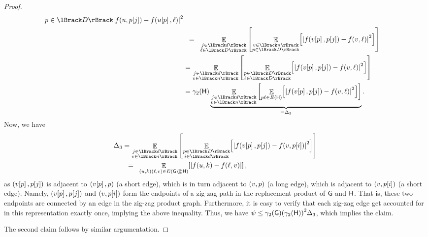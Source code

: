 \begin{proof}
\begin{align*}
{{              p \in \RangeI{D}}
           {\cardin{f\pth{u,\NX{p}{j}} - f\pth{ \NX{u}{p},\ell}}^2}}
        \\&
        \EQ
        {\ExExtS{j \in \RangeI{d}\\
              \ell \in \RangeI{D} \,}{
              \ExExtS{v \in \RangeI{n}\\
                 p \in \RangeI{D} }
              {\cardin{f\pth{\NX{v}{p},\NX{p}{j}} - f\pth{
                       v,\ell}}^2}}}
        \\
        &=  \ExExtS{
           j \in \RangeI{d}\\
           v \in \RangeI{n} \,}{%
           \ExExtS{
              p \in \RangeI{D}\\
              \ell \in \RangeI{D} }
           {\cardin{f\pth{\NX{v}{p},\NX{p}{j}} - f\pth{ v,\ell}}^2}}\\
        &= \BiDialX{\GraphB}\underbrace{ \ExExtS{
           j \in \RangeI{d}\\
           v \in \RangeI{n} \,}{ \ExExtS{ p \ell \in E(\GraphB) }
        {\cardin{f\pth{\NX{v}{p},\NX{p}{j}} - f\pth{ v,\ell}}^2}}}_{=\Delta_3}.
    \end{align*}
    Now, we have
    \begin{align*}
        \Delta_3
        &=
        \ExExtS{
           j \in \RangeI{d}\\
           v \in \RangeI{n} \,}{ \ExExtS{
              p \in \RangeI{D}\\
              i \in \RangeI{d} }
           {\cardin{f\pth{\NX{v}{p},\NX{p}{j}} - f\pth{ v,\NX{p}{i}}}^2}}
        \\&
        \EQ%
        \ExExtS{
           \pth[]{u,k}\pth[]{\ell,v} \in E\pth[]{ \ZProd{\Graph}{\GraphB}}}
           {\cardin{f\pth{u, k} - f\pth{ \ell, v} \MakeBig}},
    \end{align*}
    as $\pth[]{\NX{v}{p},\NX{p}{j}}$ is adjacent to $\pth[]{\NX{v}{p},
       p}$ (a short edge), which is in turn adjacent to $\pth[]{v, p}$
    (a long edge), which is adjacent to $\pth[]{ v,\NX{p}{i}}$ (a
    short edge). Namely, $\pth[]{\NX{v}{p},\NX{p}{j}}$ and $\pth[]{
       v,\NX{p}{i}}$ form the endpoints of a zig-zag path in the
    replacement product of $\mathsf{G}$ and $\mathsf{H}$. That is, these two
    endpoints are connected by an edge in the zig-zag product graph.
    Furthermore, it is easy to verify that each zig-zag edge get
    accounted for in this representation exactly once, implying the
    above inequality. Thus, we have $\psi \leq \BiDialX{\Graph}
    \pth{\BiDialX{\GraphB}}^2 \Delta_3$, which implies the claim.

    The second claim follows by similar argumentation.
\end{proof}


